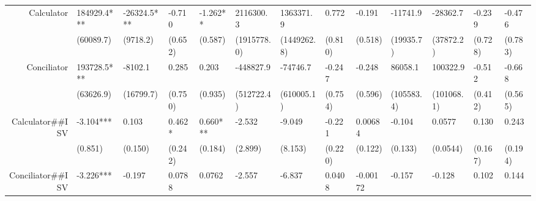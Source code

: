 \begin{tabular}{rrrrrrrrrrrrr}
Calculator & \multicolumn{1}{l}{184929.4***} & \multicolumn{1}{l}{-26324.5***} & \multicolumn{1}{l}{-0.710} & \multicolumn{1}{l}{-1.262**} & \multicolumn{1}{l}{2116300.3} & \multicolumn{1}{l}{1363371.9} & \multicolumn{1}{l}{0.772} & \multicolumn{1}{l}{-0.191} & \multicolumn{1}{l}{-11741.9} & \multicolumn{1}{l}{-28362.7} & \multicolumn{1}{l}{-0.239} & \multicolumn{1}{l}{-0.476} \\
      & \multicolumn{1}{l}{(60089.7)} & \multicolumn{1}{l}{(9718.2)} & \multicolumn{1}{l}{(0.652)} & \multicolumn{1}{l}{(0.587)} & \multicolumn{1}{l}{(1915778.0)} & \multicolumn{1}{l}{(1449262.8)} & \multicolumn{1}{l}{(0.810)} & \multicolumn{1}{l}{(0.518)} & \multicolumn{1}{l}{(19935.7)} & \multicolumn{1}{l}{(37872.2)} & \multicolumn{1}{l}{(0.728)} & \multicolumn{1}{l}{(0.783)} \\
Conciliator & \multicolumn{1}{l}{193728.5***} & \multicolumn{1}{l}{-8102.1} & \multicolumn{1}{l}{0.285} & \multicolumn{1}{l}{0.203} & \multicolumn{1}{l}{-448827.9} & \multicolumn{1}{l}{-74746.7} & \multicolumn{1}{l}{-0.247} & \multicolumn{1}{l}{-0.248} & \multicolumn{1}{l}{86058.1} & \multicolumn{1}{l}{100322.9} & \multicolumn{1}{l}{-0.512} & \multicolumn{1}{l}{-0.668} \\
      & \multicolumn{1}{l}{(63626.9)} & \multicolumn{1}{l}{(16799.7)} & \multicolumn{1}{l}{(0.750)} & \multicolumn{1}{l}{(0.935)} & \multicolumn{1}{l}{(512722.4)} & \multicolumn{1}{l}{(610005.1)} & \multicolumn{1}{l}{(0.754)} & \multicolumn{1}{l}{(0.596)} & \multicolumn{1}{l}{(105583.4)} & \multicolumn{1}{l}{(101068.1)} & \multicolumn{1}{l}{(0.412)} & \multicolumn{1}{l}{(0.565)} \\
Calculator\#\#ISV & \multicolumn{1}{l}{-3.104***} & \multicolumn{1}{l}{0.103} & \multicolumn{1}{l}{0.462*} & \multicolumn{1}{l}{0.660***} & \multicolumn{1}{l}{-2.532} & \multicolumn{1}{l}{-9.049} & \multicolumn{1}{l}{-0.221} & \multicolumn{1}{l}{0.00684} & \multicolumn{1}{l}{-0.104} & \multicolumn{1}{l}{0.0577} & \multicolumn{1}{l}{0.130} & \multicolumn{1}{l}{0.243} \\
      & \multicolumn{1}{l}{(0.851)} & \multicolumn{1}{l}{(0.150)} & \multicolumn{1}{l}{(0.242)} & \multicolumn{1}{l}{(0.184)} & \multicolumn{1}{l}{(2.899)} & \multicolumn{1}{l}{(8.153)} & \multicolumn{1}{l}{(0.220)} & \multicolumn{1}{l}{(0.122)} & \multicolumn{1}{l}{(0.133)} & \multicolumn{1}{l}{(0.0544)} & \multicolumn{1}{l}{(0.167)} & \multicolumn{1}{l}{(0.194)} \\
Conciliator\#\#ISV & \multicolumn{1}{l}{-3.226***} & \multicolumn{1}{l}{-0.197} & \multicolumn{1}{l}{0.0788} & \multicolumn{1}{l}{0.0762} & \multicolumn{1}{l}{-2.557} & \multicolumn{1}{l}{-6.837} & \multicolumn{1}{l}{0.0408} & \multicolumn{1}{l}{-0.00172} & \multicolumn{1}{l}{-0.157} & \multicolumn{1}{l}{-0.128} & \multicolumn{1}{l}{0.102} & \multicolumn{1}{l}{0.144} \\

\end{tabular}
